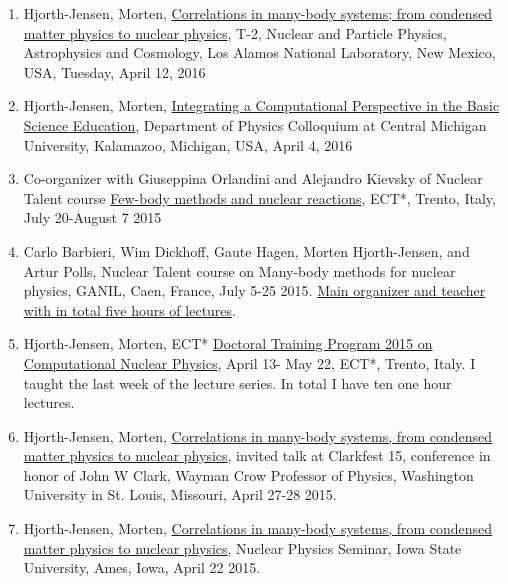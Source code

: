 \documentclass[a4wide,10pt]{article}
\begin{document}
\begin{enumerate}
\item Hjorth-Jensen, Morten, \href{{https://t2.lanl.gov/seminars/?section=abstract&number=-10&year=2016}}{Correlations in many-body systems; from condensed matter physics to nuclear physics}, T-2, Nuclear and Particle Physics, Astrophysics and Cosmology, Los Alamos National Laboratory, New Mexico, USA, Tuesday, April 12, 2016

\item Hjorth-Jensen, Morten, \href{{http://mhjensenseminars.github.io/EducationalSeminars/doc/pub/cse/html/cse-reveal.html}}{Integrating a Computational Perspective in the Basic Science Education}, Department of Physics Colloquium at Central  Michigan University,  Kalamazoo, Michigan, USA, April 4, 2016

\item Co-organizer with Giuseppina Orlandini and Alejandro Kievsky of Nuclear Talent course \href{{https://groups.nscl.msu.edu/jina/talent/wiki/Course_3}}{Few-body methods and nuclear reactions}, ECT*, Trento, Italy, July 20-August 7 2015

\item Carlo Barbieri, Wim Dickhoff, Gaute Hagen, Morten Hjorth-Jensen, and Artur Polls, Nuclear Talent course on Many-body methods for nuclear physics, GANIL, Caen, France, July 5-25 2015. \href{{http://nucleartalent.github.io/Course2ManyBodyMethods/doc/web/course.html}}{Main organizer and teacher with in total five hours of lectures}. 

\item Hjorth-Jensen, Morten, ECT* \href{{http://www.ectstar.eu/node/1287}}{Doctoral Training Program 2015 on Computational Nuclear Physics}, April 13- May 22, ECT*, Trento, Italy. I taught the last week of the lecture series. In total I have ten one hour lectures. 

\item Hjorth-Jensen, Morten, \href{{http://clarkfest15.physics.wustl.edu/Docs/intro.php}}{Correlations in many-body systems, from condensed matter physics to nuclear physics}, invited talk at Clarkfest 15,  conference in honor of John W Clark, Wayman Crow Professor of Physics, Washington University in St. Louis, Missouri, April 27-28 2015.

\item Hjorth-Jensen, Morten, \href{{http://www.event.iastate.edu/event/35628}}{Correlations in many-body systems, from condensed matter physics to nuclear physics}, Nuclear Physics Seminar, Iowa State University, Ames, Iowa, April 22 2015.


\end{enumerate}
\end{document}
